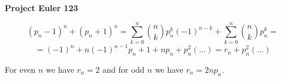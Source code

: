 \documentclass[a4paper,12pt]{article}
\begin{document}
\setlength\parindent{0pt}
\textbf{Project Euler 123}
\vspace{5ex}

\[(p_n - 1)^n + (p_n + 1)^n = \sum_{k = 0}^n \binom{n}{k} p_n^k (-1)^{n - k} + \sum_{k = 0}^n \binom{n}{k} p_n^k =\] \[= (-1)^n + n(-1)^{n - 1}p_n + 1 + np_n + p_n^2 (\dots) = r_n + p_n^2(\dots)\]

For even \(n\) we have \(r_n = 2\) and for odd \(n\) we have \(r_n = 2np_n\).
\end{document}
